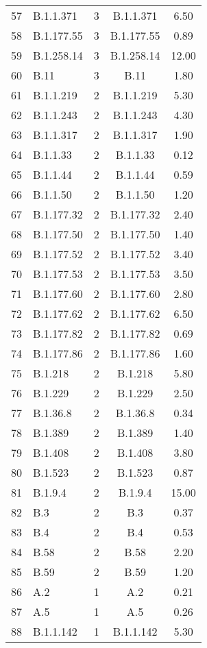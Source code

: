 \begin{longtable}{lp{4cm}ccc}
  57 & B.1.1.371 &   3 & B.1.1.371 & 6.50 \\ 
  58 & B.1.177.55 &   3 & B.1.177.55 & 0.89 \\ 
  59 & B.1.258.14 &   3 & B.1.258.14 & 12.00 \\ 
  60 & B.11 &   3 & B.11 & 1.80 \\ 
  61 & B.1.1.219 &   2 & B.1.1.219 & 5.30 \\ 
  62 & B.1.1.243 &   2 & B.1.1.243 & 4.30 \\ 
  63 & B.1.1.317 &   2 & B.1.1.317 & 1.90 \\ 
  64 & B.1.1.33 &   2 & B.1.1.33 & 0.12 \\ 
  65 & B.1.1.44 &   2 & B.1.1.44 & 0.59 \\ 
  66 & B.1.1.50 &   2 & B.1.1.50 & 1.20 \\ 
  67 & B.1.177.32 &   2 & B.1.177.32 & 2.40 \\ 
  68 & B.1.177.50 &   2 & B.1.177.50 & 1.40 \\ 
  69 & B.1.177.52 &   2 & B.1.177.52 & 3.40 \\ 
  70 & B.1.177.53 &   2 & B.1.177.53 & 3.50 \\ 
  71 & B.1.177.60 &   2 & B.1.177.60 & 2.80 \\ 
  72 & B.1.177.62 &   2 & B.1.177.62 & 6.50 \\ 
  73 & B.1.177.82 &   2 & B.1.177.82 & 0.69 \\ 
  74 & B.1.177.86 &   2 & B.1.177.86 & 1.60 \\ 
  75 & B.1.218 &   2 & B.1.218 & 5.80 \\ 
  76 & B.1.229 &   2 & B.1.229 & 2.50 \\ 
  77 & B.1.36.8 &   2 & B.1.36.8 & 0.34 \\ 
  78 & B.1.389 &   2 & B.1.389 & 1.40 \\ 
  79 & B.1.408 &   2 & B.1.408 & 3.80 \\ 
  80 & B.1.523 &   2 & B.1.523 & 0.87 \\ 
  81 & B.1.9.4 &   2 & B.1.9.4 & 15.00 \\ 
  82 & B.3 &   2 & B.3 & 0.37 \\ 
  83 & B.4 &   2 & B.4 & 0.53 \\ 
  84 & B.58 &   2 & B.58 & 2.20 \\ 
  85 & B.59 &   2 & B.59 & 1.20 \\ 
  86 & A.2 &   1 & A.2 & 0.21 \\ 
  87 & A.5 &   1 & A.5 & 0.26 \\ 
  88 & B.1.1.142 &   1 & B.1.1.142 & 5.30 \\ 

\end{longtable}
